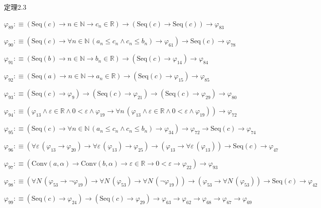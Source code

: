 \begin{fullproof}{定理2.3}
\begin{abbrevlist}
\item $\varphi_{89} :\equiv (\mathrm{Seq}(c) \to n \in \mathbb{N} \to c_{n} \in \mathbb{R}) \to (\mathrm{Seq}(c) \to \mathrm{Seq}(c)) \to \varphi_{83}$
\item $\varphi_{90} :\equiv (\mathrm{Seq}(c) \to \forall n \in \mathbb{N}\,(a_{n} \leq c_{n} \land c_{n} \leq b_{n}) \to \varphi_{61}) \to \mathrm{Seq}(c) \to \varphi_{78}$
\item $\varphi_{91} :\equiv (\mathrm{Seq}(b) \to n \in \mathbb{N} \to b_{n} \in \mathbb{R}) \to (\mathrm{Seq}(c) \to \varphi_{14}) \to \varphi_{84}$
\item $\varphi_{92} :\equiv (\mathrm{Seq}(a) \to n \in \mathbb{N} \to a_{n} \in \mathbb{R}) \to (\mathrm{Seq}(c) \to \varphi_{15}) \to \varphi_{85}$
\item $\varphi_{93} :\equiv (\mathrm{Seq}(c) \to \varphi_{9}) \to (\mathrm{Seq}(c) \to \varphi_{21}) \to (\mathrm{Seq}(c) \to \varphi_{29}) \to \varphi_{80}$
\item $\varphi_{94} :\equiv (\varphi_{13} \land \varepsilon \in \mathbb{R} \land 0 < \varepsilon \land \varphi_{19} \to \forall n\,(\varphi_{13} \land \varepsilon \in \mathbb{R} \land 0 < \varepsilon \land \varphi_{19})) \to \varphi_{72}$
\item $\varphi_{95} :\equiv (\mathrm{Seq}(c) \to \forall n \in \mathbb{N}\,(a_{n} \leq c_{n} \land c_{n} \leq b_{n}) \to \varphi_{34}) \to \varphi_{72} \to \mathrm{Seq}(c) \to \varphi_{74}$
\item $\varphi_{96} :\equiv (\forall \varepsilon\,(\varphi_{13} \to \varphi_{20}) \to \forall \varepsilon\,(\varphi_{13}) \to \varphi_{25}) \to (\varphi_{13} \to \forall \varepsilon\,(\varphi_{13})) \to \mathrm{Seq}(c) \to \varphi_{47}$
\item $\varphi_{97} :\equiv (\mathrm{Conv}(a,\alpha) \to \mathrm{Conv}(b,\alpha) \to \varepsilon \in \mathbb{R} \to 0 < \varepsilon \to \varphi_{22}) \to \varphi_{93}$
\item $\varphi_{98} :\equiv (\forall N\,(\varphi_{53} \to \neg \varphi_{19}) \to \forall N\,(\varphi_{53}) \to \forall N\,(\neg \varphi_{19})) \to (\varphi_{53} \to \forall N\,(\varphi_{53})) \to \mathrm{Seq}(c) \to \varphi_{42}$
\item $\varphi_{99} :\equiv (\mathrm{Seq}(c) \to \varphi_{24}) \to (\mathrm{Seq}(c) \to \varphi_{29}) \to \varphi_{63} \to \varphi_{62} \to \varphi_{68} \to \varphi_{67} \to \varphi_{69}$
\end{abbrevlist}
\end{fullproof}
